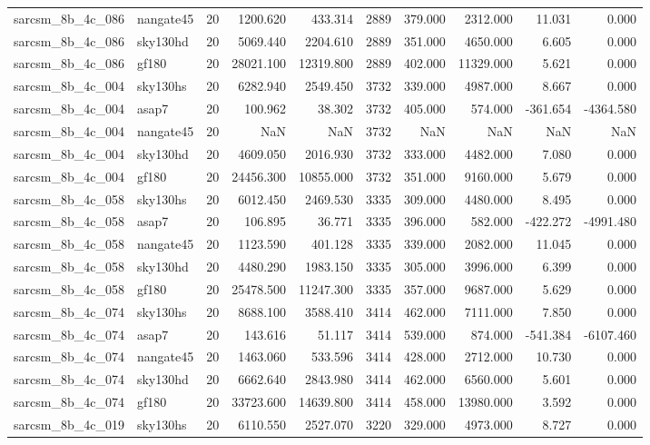 \begin{tabular}{llrrrrrrrr}
sarcsm\_8b\_4c\_086 & nangate45 & 20 & 1200.620 & 433.314 & 2889 & 379.000 & 2312.000 & 11.031 & 0.000 \\
sarcsm\_8b\_4c\_086 & sky130hd & 20 & 5069.440 & 2204.610 & 2889 & 351.000 & 4650.000 & 6.605 & 0.000 \\
sarcsm\_8b\_4c\_086 & gf180 & 20 & 28021.100 & 12319.800 & 2889 & 402.000 & 11329.000 & 5.621 & 0.000 \\
sarcsm\_8b\_4c\_004 & sky130hs & 20 & 6282.940 & 2549.450 & 3732 & 339.000 & 4987.000 & 8.667 & 0.000 \\
sarcsm\_8b\_4c\_004 & asap7 & 20 & 100.962 & 38.302 & 3732 & 405.000 & 574.000 & -361.654 & -4364.580 \\
sarcsm\_8b\_4c\_004 & nangate45 & 20 & NaN & NaN & 3732 & NaN & NaN & NaN & NaN \\
sarcsm\_8b\_4c\_004 & sky130hd & 20 & 4609.050 & 2016.930 & 3732 & 333.000 & 4482.000 & 7.080 & 0.000 \\
sarcsm\_8b\_4c\_004 & gf180 & 20 & 24456.300 & 10855.000 & 3732 & 351.000 & 9160.000 & 5.679 & 0.000 \\
sarcsm\_8b\_4c\_058 & sky130hs & 20 & 6012.450 & 2469.530 & 3335 & 309.000 & 4480.000 & 8.495 & 0.000 \\
sarcsm\_8b\_4c\_058 & asap7 & 20 & 106.895 & 36.771 & 3335 & 396.000 & 582.000 & -422.272 & -4991.480 \\
sarcsm\_8b\_4c\_058 & nangate45 & 20 & 1123.590 & 401.128 & 3335 & 339.000 & 2082.000 & 11.045 & 0.000 \\
sarcsm\_8b\_4c\_058 & sky130hd & 20 & 4480.290 & 1983.150 & 3335 & 305.000 & 3996.000 & 6.399 & 0.000 \\
sarcsm\_8b\_4c\_058 & gf180 & 20 & 25478.500 & 11247.300 & 3335 & 357.000 & 9687.000 & 5.629 & 0.000 \\
sarcsm\_8b\_4c\_074 & sky130hs & 20 & 8688.100 & 3588.410 & 3414 & 462.000 & 7111.000 & 7.850 & 0.000 \\
sarcsm\_8b\_4c\_074 & asap7 & 20 & 143.616 & 51.117 & 3414 & 539.000 & 874.000 & -541.384 & -6107.460 \\
sarcsm\_8b\_4c\_074 & nangate45 & 20 & 1463.060 & 533.596 & 3414 & 428.000 & 2712.000 & 10.730 & 0.000 \\
sarcsm\_8b\_4c\_074 & sky130hd & 20 & 6662.640 & 2843.980 & 3414 & 462.000 & 6560.000 & 5.601 & 0.000 \\
sarcsm\_8b\_4c\_074 & gf180 & 20 & 33723.600 & 14639.800 & 3414 & 458.000 & 13980.000 & 3.592 & 0.000 \\
sarcsm\_8b\_4c\_019 & sky130hs & 20 & 6110.550 & 2527.070 & 3220 & 329.000 & 4973.000 & 8.727 & 0.000 \\

\end{tabular}
